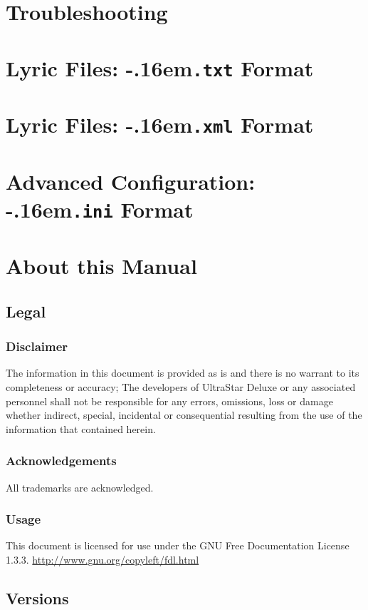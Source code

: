 \documentclass{scrreprt}
\newcommand*\fileending[1]{\texorpdfstring{\kern-.16em\texttt{#1}}{#1}}
\begin{document}
\chapter{Troubleshooting}

\appendix

\chapter{Lyric Files: \fileending{.txt} Format}

\chapter{Lyric Files: \fileending{.xml} Format}

\chapter{Advanced Configuration: \fileending{.ini} Format}

\chapter{About this Manual}
\section{Legal}
\subsection{Disclaimer}
The information in this document is provided as is
and there is no warrant to its completeness or accuracy;
The developers of UltraStar Deluxe or any associated personnel
shall not be responsible for any errors, omissions, loss or damage
whether indirect, special, incidental or consequential
resulting from the use of the information that contained herein.

\subsection{Acknowledgements}
All trademarks are acknowledged.

\subsection{Usage}
This document is licensed for use
under the GNU Free Documentation License 1.3.3.
\url{http://www.gnu.org/copyleft/fdl.html}

\section{Versions}
\end{document}
